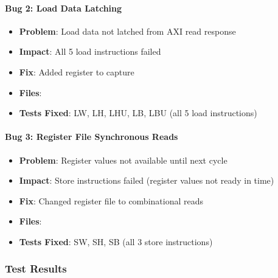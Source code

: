 \paragraph{Bug 2: Load Data Latching}\label{cr:fix:fixes-index:bug-2-load-data-latching}

\begin{record}

\begin{itemize}
\tightlist
\item
  \textbf{Problem}: Load data not latched from AXI read response
\item
  \textbf{Impact}: All 5 load instructions failed
\item
  \textbf{Fix}: Added  register to capture
\item
  \textbf{Files}: 
\item
  \textbf{Tests Fixed}: LW, LH, LHU, LB, LBU (all 5 load instructions)
\end{itemize}

\end{record}

\paragraph{Bug 3: Register File Synchronous Reads}\label{cr:fix:fixes-index:bug-3-register-file-synchronous-reads}

\begin{record}

\begin{itemize}
\tightlist
\item
  \textbf{Problem}: Register values not available until next cycle
\item
  \textbf{Impact}: Store instructions failed (register values not ready
  in time)
\item
  \textbf{Fix}: Changed register file to combinational reads
\item
  \textbf{Files}: 
\item
  \textbf{Tests Fixed}: SW, SH, SB (all 3 store instructions)
\end{itemize}

\end{record}

\subsubsection{Test Results}\label{cr:fix:fixes-index:test-results}

